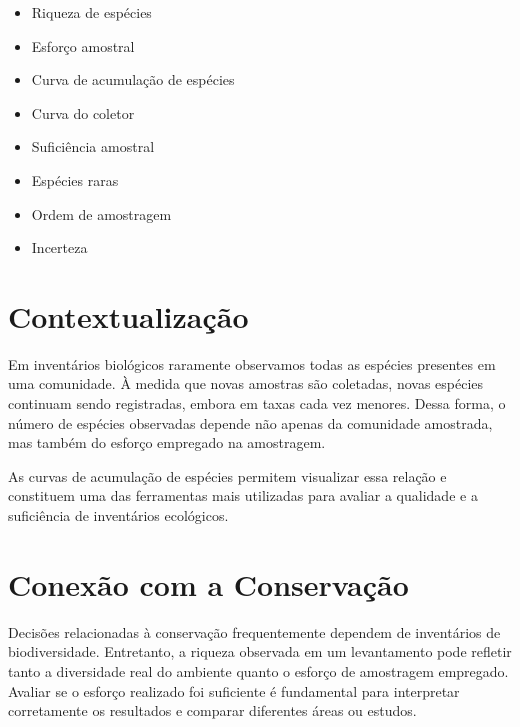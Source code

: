 \documentclass[
  letterpaper,
  DIV=11,
  numbers=noendperiod]{scrartcl}
\begin{document}
\begin{tcolorbox}[enhanced jigsaw, arc=.35mm, bottomrule=.15mm, bottomtitle=1mm, breakable, colback=white, colbacktitle=quarto-callout-note-color!10!white, colframe=quarto-callout-note-color-frame, coltitle=black, left=2mm, leftrule=.75mm, opacityback=0, opacitybacktitle=0.6, rightrule=.15mm, title=\textcolor{quarto-callout-note-color}{\faInfo}\hspace{0.5em}{Conceitos-chave}, titlerule=0mm, toprule=.15mm, toptitle=1mm]

\begin{itemize}
\item
  Riqueza de espécies
\item
  Esforço amostral
\item
  Curva de acumulação de espécies
\item
  Curva do coletor
\item
  Suficiência amostral
\item
  Espécies raras
\item
  Ordem de amostragem
\item
  Incerteza
\end{itemize}

\end{tcolorbox}

\section{Contextualização}\label{contextualizauxe7uxe3o}

Em inventários biológicos raramente observamos todas as espécies
presentes em uma comunidade. À medida que novas amostras são coletadas,
novas espécies continuam sendo registradas, embora em taxas cada vez
menores. Dessa forma, o número de espécies observadas depende não apenas
da comunidade amostrada, mas também do esforço empregado na amostragem.

As curvas de acumulação de espécies permitem visualizar essa relação e
constituem uma das ferramentas mais utilizadas para avaliar a qualidade
e a suficiência de inventários ecológicos.

\section{Conexão com a
Conservação}\label{conexuxe3o-com-a-conservauxe7uxe3o}

Decisões relacionadas à conservação frequentemente dependem de
inventários de biodiversidade. Entretanto, a riqueza observada em um
levantamento pode refletir tanto a diversidade real do ambiente quanto o
esforço de amostragem empregado. Avaliar se o esforço realizado foi
suficiente é fundamental para interpretar corretamente os resultados e
comparar diferentes áreas ou estudos.
\end{document}

